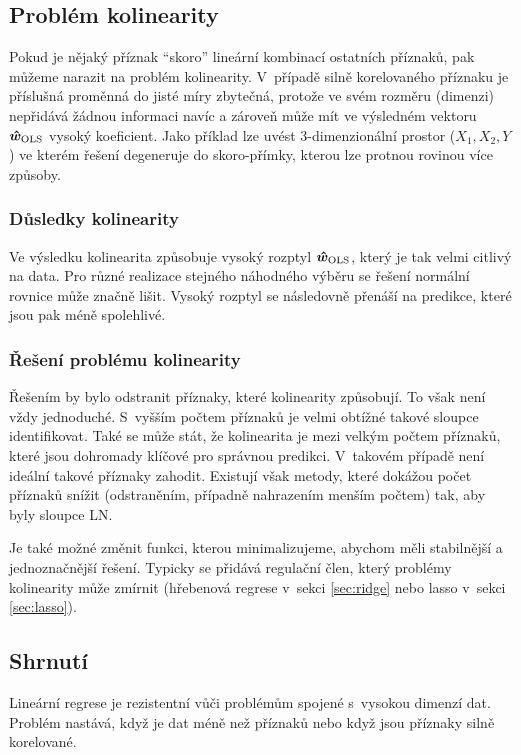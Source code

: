\subsection{Problém kolinearity}

Pokud je nějaký příznak ``skoro'' lineární kombinací ostatních příznaků, pak můžeme narazit na problém kolinearity. V~případě silně korelovaného příznaku je příslušná proměnná do jisté míry zbytečná, protože ve svém rozměru (dimenzi) nepřidává žádnou informaci navíc a zároveň může mít ve výsledném vektoru $\bm{\hat{w}}_{\text{OLS}}$ vysoký koeficient. Jako příklad lze uvést 3-dimenzionální prostor ($X_1, X_2, Y$) ve kterém řešení degeneruje do skoro-přímky, kterou lze protnou rovinou více způsoby.

\subsubsection{Důsledky kolinearity}

Ve výsledku kolinearita způsobuje vysoký rozptyl $\bm{\hat{w}}_{\text{OLS}}$, který je tak velmi citlivý na data. Pro různé realizace stejného náhodného výběru se řešení normální rovnice může značně lišit. Vysoký rozptyl se následovně přenáší na predikce, které jsou pak méně spolehlivé.

\subsubsection{Řešení problému kolinearity}

Řešením by bylo odstranit příznaky, které kolinearity způsobují. To však není vždy jednoduché. S~vyšším počtem příznaků je velmi obtížné takové sloupce identifikovat. Také se může stát, že kolinearita je mezi velkým počtem příznaků, které jsou dohromady klíčové pro správnou predikci. V~takovém případě není ideální takové příznaky zahodit. Existují však metody, které dokážou počet příznaků snížit (odstraněním, případně nahrazením menším počtem) tak, aby byly sloupce LN.

Je také možné změnit funkci, kterou minimalizujeme, abychom měli stabilnější a jednoznačnější řešení. Typicky se přidává regulační člen, který problémy kolinearity může zmírnit (hřebenová regrese v~sekci \ref{sec:ridge} nebo lasso v~sekci \ref{sec:lasso}).

\subsection{Shrnutí}

Lineární regrese je rezistentní vůči problémům spojené s~vysokou dimenzí dat. Problém nastává, když je dat méně než příznaků nebo když jsou příznaky silně korelované.

